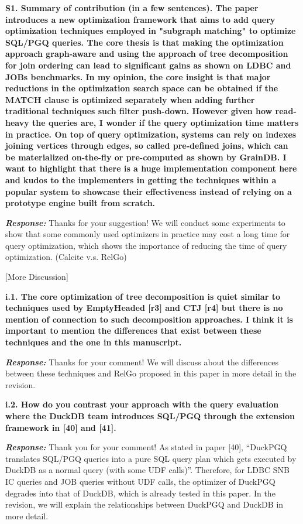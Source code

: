 \textbf{S1. Summary of contribution (in a few sentences). 
The paper introduces a new optimization framework that aims to add query optimization techniques employed in "subgraph matching" to optimize SQL/PGQ queries. The core thesis is that making the optimization approach graph-aware and using the approach of tree decomposition for join ordering can lead to significant gains as shown on LDBC and JOBs benchmarks.
In my opinion, the core insight is that major reductions in the optimization search space can be obtained if the MATCH clause is optimized separately when adding further traditional techniques such filter push-down. However given how read-heavy the queries are, I wonder if the query optimization time matters in practice. On top of query optimization, systems can rely on indexes joining vertices through edges, so called pre-defined joins, which can be materialized on-the-fly or pre-computed as shown by GrainDB. I want to highlight that there is a huge implementation component here and kudos to the implementers in getting the techniques within a popular system to showcase their effectiveness instead of relying on a prototype engine built from scratch.}

\textbf{\textit{Response: }}
Thanks for your suggestion! We will conduct some experiments to show that some commonly used optimizers in practice may cost a long time for query optimization, which shows the importance of reducing the time of query optimization. (Calcite v.s. RelGo)

[More Discussion]

\textbf{
i.1. The core optimization of tree decomposition is quiet similar to techniques used by EmptyHeaded [r3] and CTJ [r4] but there is no mention of connection to such decomposition approaches. I think it is important to mention the differences that exist between these techniques and the one in this manuscript.}

\textbf{\textit{Response: }}
Thanks for your comment! We will discuss about the differences between these techniques and RelGo proposed in this paper in more detail in the revision.


\textbf{i.2. How do you contrast your approach with the query evaluation where the DuckDB team introduces SQL/PGQ through the extension framework in [40] and [41].}

\textbf{\textit{Response: }}
Thank you for your comment! As stated in paper [40], ``DuckPGQ translates SQL/PGQ queries into a pure SQL query plan which gets executed by DuckDB as a normal query (with some UDF calls)''. Therefore, for LDBC SNB IC queries and JOB queries without UDF calls, the optimizer of DuckPGQ degrades into that of DuckDB, which is already tested in this paper. In the revision, we will explain the relationships between DuckPGQ and DuckDB in more detail.

